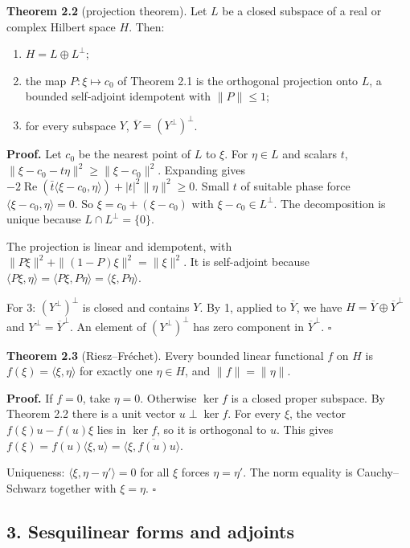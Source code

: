 \documentclass[
  english,
  11pt,
  a4paper,
]{article}
\providecommand{\tightlist}{%
  \setlength{\itemsep}{0pt}\setlength{\parskip}{0pt}}
\begin{document}
\textbf{Theorem 2.2} (projection theorem). Let \(L\) be a closed
subspace of a real or complex Hilbert space \(H\). Then:

\begin{enumerate}
\tightlist
\item
  \(H=L\oplus L^\perp\);
\item
  the map \(P:\xi\mapsto c_0\) of Theorem 2.1 is the orthogonal
  projection onto \(L\), a bounded self-adjoint idempotent with
  \(\|P\|\le1\);
\item
  for every subspace \(Y\), \(\overline Y=(Y^\perp)^\perp\).
\end{enumerate}

\textbf{Proof.} Let \(c_0\) be the nearest point of \(L\) to \(\xi\).
For \(\eta\in L\) and scalars \(t\),
\(\|\xi-c_0-t\eta\|^2\ge\|\xi-c_0\|^2\). Expanding gives
\(-2\operatorname{Re}(\bar t\langle\xi-c_0,\eta\rangle)+|t|^2\|\eta\|^2\ge0\).
Small \(t\) of suitable phase force \(\langle\xi-c_0,\eta\rangle=0\). So
\(\xi=c_0+(\xi-c_0)\) with \(\xi-c_0\in L^\perp\). The decomposition is
unique because \(L\cap L^\perp=\{0\}\).

The projection is linear and idempotent, with
\(\|P\xi\|^2+\|(1-P)\xi\|^2=\|\xi\|^2\). It is self-adjoint because
\(\langle P\xi,\eta\rangle=\langle P\xi,P\eta\rangle=\langle\xi,P\eta\rangle\).

For 3: \((Y^\perp)^\perp\) is closed and contains \(Y\). By 1, applied
to \(\overline Y\), we have \(H=\overline Y\oplus\overline Y^\perp\) and
\(Y^\perp=\overline Y^\perp\). An element of \((Y^\perp)^\perp\) has
zero component in \(\overline Y^\perp\). \(\square\)

\textbf{Theorem 2.3} (Riesz--Fréchet). Every bounded linear functional
\(f\) on \(H\) is \(f(\xi)=\langle\xi,\eta\rangle\) for exactly one
\(\eta\in H\), and \(\|f\|=\|\eta\|\).

\textbf{Proof.} If \(f=0\), take \(\eta=0\). Otherwise \(\ker f\) is a
closed proper subspace. By Theorem 2.2 there is a unit vector
\(u\perp\ker f\). For every \(\xi\), the vector \(f(\xi)u-f(u)\xi\) lies
in \(\ker f\), so it is orthogonal to \(u\). This gives
\(f(\xi)=f(u)\langle\xi,u\rangle=\langle\xi,\overline{f(u)}u\rangle\).

Uniqueness: \(\langle\xi,\eta-\eta'\rangle=0\) for all \(\xi\) forces
\(\eta=\eta'\). The norm equality is Cauchy--Schwarz together with
\(\xi=\eta\). \(\square\)

\subsection[3. Sesquilinear forms and
adjoints]{\texorpdfstring{\protect\hypertarget{hilbert-spaces-and-compact-operators--oa-fnd-hs-03}{}{}3.
Sesquilinear forms and
adjoints}{3. Sesquilinear forms and adjoints}}\label{hilbert-spaces-and-compact-operators--OA-FND-HS-03}
\end{document}

